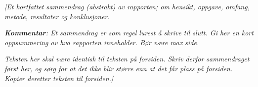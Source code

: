 \documentclass[../main.tex]{subfiles}
\begin{document}
\bigskip

{\itshape\color{blue}
[Et kortfattet sammendrag (abstrakt) av rapporten; om hensikt, oppgave, omfang, metode, resultater og konklusjoner.}

{\itshape\color{blue}
\textbf{Kommentar}: Et sammendrag er som regel lurest {\aa} skrive til slutt. Gi her en kort oppsummering av hva
rapporten inneholder. B{\o}r v{\ae}re max {\textonehalf} side.}

{\itshape\color{blue}
Teksten her skal v{\ae}re identisk til teksten p{\aa} forsiden. Skriv derfor sammendraget f{\o}rst her, og s{\o}rg for
at det ikke blir st{\o}rre enn at det f{\aa}r plass p{\aa} forsiden. Kopier deretter teksten til forsiden.]}


\bigskip
\end{document}
